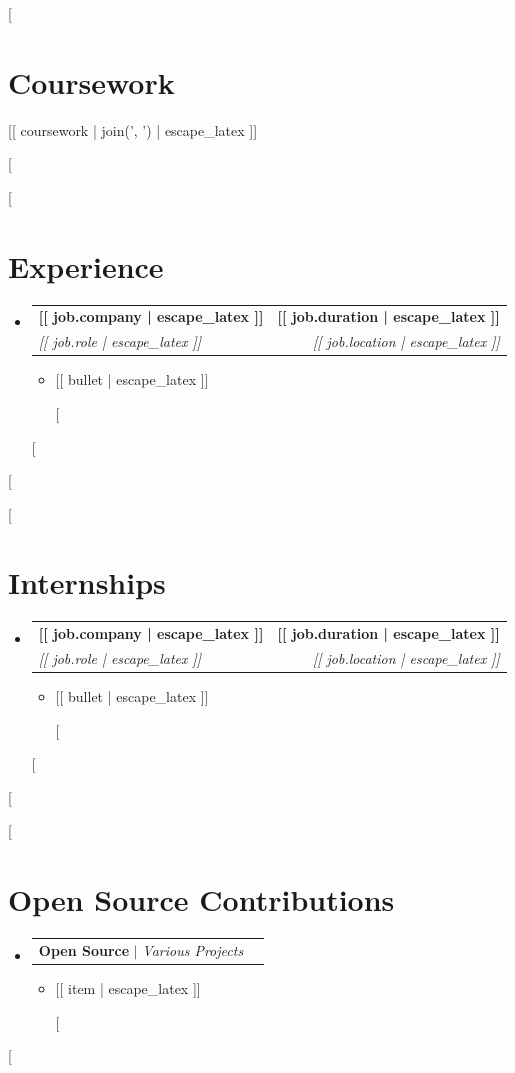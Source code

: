 \documentclass[letterpaper,11pt]{article}
\makeatletter
\newcommand{\resumeItem}[1]{
  \item\small{{#1 \vspace{-2pt}}}
}
\newcommand{\resumeSubheading}[4]{
  \vspace{-2pt}\item
    \begin{tabular*}{1.0\textwidth}[t]{l@{\extracolsep{\fill}}r}
      \textbf{#1} & \textbf{\small #2} \\
      \textit{\small#3} & \textit{\small #4} \\
    \end{tabular*}\vspace{-7pt}
}
\newcommand{\resumeProjectHeading}[2]{
    \item
    \begin{tabular*}{1.001\textwidth}{l@{\extracolsep{\fill}}r}
      \small#1 & \textbf{\small #2}\\
    \end{tabular*}\vspace{-7pt}
}
\newcommand{\resumeSubHeadingListStart}{\begin{itemize}[leftmargin=0.0in, label={}]}
\newcommand{\resumeSubHeadingListEnd}{\end{itemize}}
\newcommand{\resumeItemListStart}{\begin{itemize}}
\newcommand{\resumeItemListEnd}{\end{itemize}\vspace{-5pt}}
\makeatother
\begin{document}
[%
\section{Coursework}
 \begin{itemize}[leftmargin=0.15in, label={}]
    \small{\item{[[ coursework | join(', ') | escape_latex ]]}}
 \end{itemize}
 \vspace{-16pt}
[%

[%
\section{Experience}
  \resumeSubHeadingListStart
    [%
    \resumeSubheading
      {[[ job.company | escape_latex ]]}{[[ job.duration | escape_latex ]]}
      {[[ job.role | escape_latex ]]}{[[ job.location | escape_latex ]]}
      \resumeItemListStart
        [%
        \resumeItem{[[ bullet | escape_latex ]]}
        [%
      \resumeItemListEnd
    [%
  \resumeSubHeadingListEnd
\vspace{-16pt}
[%

[%
\section{Internships}
  \resumeSubHeadingListStart
    [%
    \resumeSubheading
      {[[ job.company | escape_latex ]]}{[[ job.duration | escape_latex ]]}
      {[[ job.role | escape_latex ]]}{[[ job.location | escape_latex ]]}
      \resumeItemListStart
        [%
        \resumeItem{[[ bullet | escape_latex ]]}
        [%
      \resumeItemListEnd
    [%
  \resumeSubHeadingListEnd
\vspace{-16pt}
[%

[%
\section{Open Source Contributions}
    \resumeSubHeadingListStart
      \resumeProjectHeading
          {\textbf{Open Source} $|$ \emph{Various Projects}}{}
          \resumeItemListStart
            [%
            \resumeItem{[[ item | escape_latex ]]}
            [%
          \resumeItemListEnd
    \resumeSubHeadingListEnd
[%
\end{document}
